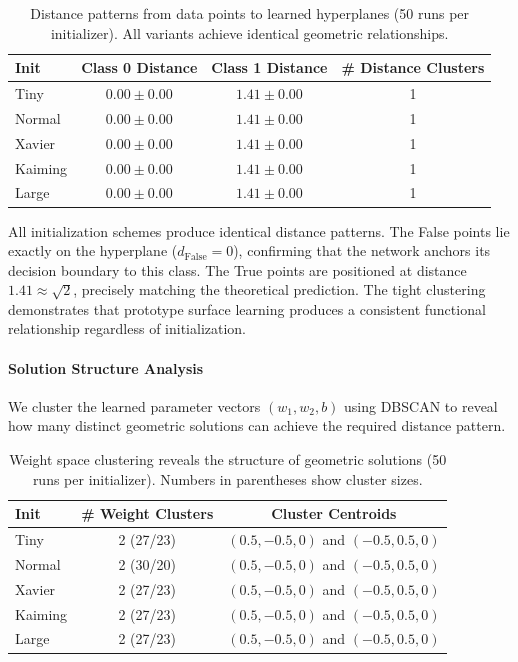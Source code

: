\begin{table}[ht]
\centering
\caption{Distance patterns from data points to learned hyperplanes (50 runs per initializer). All variants achieve identical geometric relationships.}
\label{tab:abs1-distance-clusters}
\begin{tabular}{lccc}
\toprule
Init & Class 0 Distance & Class 1 Distance & \# Distance Clusters \\
\midrule
Tiny    & $0.00 \pm 0.00$ & $1.41 \pm 0.00$ & 1 \\
Normal  & $0.00 \pm 0.00$ & $1.41 \pm 0.00$ & 1 \\
Xavier  & $0.00 \pm 0.00$ & $1.41 \pm 0.00$ & 1 \\
Kaiming & $0.00 \pm 0.00$ & $1.41 \pm 0.00$ & 1 \\
Large   & $0.00 \pm 0.00$ & $1.41 \pm 0.00$ & 1 \\
\bottomrule
\end{tabular}
\end{table}

All initialization schemes produce identical distance patterns. The False points lie exactly on the hyperplane ($d_{\text{False}} = 0$), confirming that the network anchors its decision boundary to this class. The True points are positioned at distance $1.41 \approx \sqrt{2}$, precisely matching the theoretical prediction. The tight clustering demonstrates that prototype surface learning produces a consistent functional relationship regardless of initialization.

\paragraph{Solution Structure Analysis}
We cluster the learned parameter vectors $(w_1, w_2, b)$ using DBSCAN to reveal how many distinct geometric solutions can achieve the required distance pattern.

\begin{table}[ht]
\centering
\caption{Weight space clustering reveals the structure of geometric solutions (50 runs per initializer). Numbers in parentheses show cluster sizes.}
\label{tab:abs1-weight-clusters}
\begin{tabular}{lcc}
\toprule
Init & \# Weight Clusters & Cluster Centroids \\
\midrule
Tiny    & 2 (27/23) & $(0.5, -0.5, 0)$ and $(-0.5, 0.5, 0)$ \\
Normal  & 2 (30/20) & $(0.5, -0.5, 0)$ and $(-0.5, 0.5, 0)$ \\
Xavier  & 2 (27/23) & $(0.5, -0.5, 0)$ and $(-0.5, 0.5, 0)$ \\
Kaiming & 2 (27/23) & $(0.5, -0.5, 0)$ and $(-0.5, 0.5, 0)$ \\
Large   & 2 (27/23) & $(0.5, -0.5, 0)$ and $(-0.5, 0.5, 0)$ \\
\bottomrule
\end{tabular}
\end{table}

